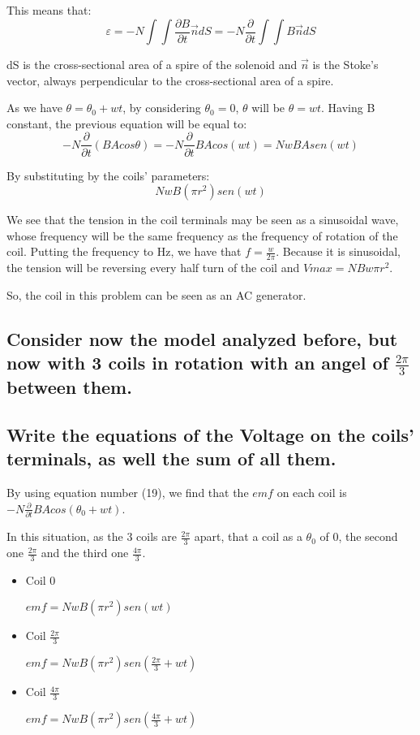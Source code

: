 \documentclass[a4paper,12pt]{article}
\begin{document}
This means that:
\begin{equation}
\varepsilon = -N\int \int \frac{\partial B}{\partial t}\vec{n}dS = -N\frac{\partial }{\partial t}\int \int B\vec{n}dS
\end{equation}


dS is the cross-sectional area of a spire of the solenoid and $\vec{n}$ is the Stoke's vector, always perpendicular to the cross-sectional area of a spire.


As we have $\theta = \theta_0 + wt$, by considering $\theta_0 = 0$, $\theta$ will be $\theta = wt$. Having B constant, the previous equation will be equal to:
\begin{equation}
-N\frac{\partial}{\partial t}(BAcos\theta ) = -N\frac{\partial }{\partial t}BAcos\left (wt  \right ) = NwBAsen\left (wt \right )
\end{equation}

By substituting by the coils' parameters:
\begin{equation}
NwB(\pi r^2)sen\left (wt \right )
\end{equation}
	
We see that the tension in the coil terminals may be seen as a sinusoidal wave, whose frequency will be the same frequency as the frequency of rotation of the coil. Putting the frequency to Hz, we have that $f = \frac{w}{2\pi}$. 
Because it is sinusoidal, the tension will be reversing every half turn of the coil and $Vmax = NBw\pi r^2$.

So, the coil in this problem can be seen as an AC generator.


\subsection{Consider now the model analyzed before, but now with 3 coils in rotation with an angel of $\frac{2 \pi}{3}$ between them.}
\subsection{Write the equations of the Voltage on the coils' terminals, as well the sum of all them.}

By using equation number (19), we find that the $emf$ on each coil is $-N\frac{\partial }{\partial t} BA cos(\theta _0 + wt)$. 

In this situation, as the 3 coils are $\frac{2 \pi}{3}$ apart, that a coil as a $\theta_0$ of $0$, the second one $\frac{2 \pi}{3}$ and the third one $\frac{4 \pi}{3}$.
\begin{itemize}
\item Coil $0$

$emf = NwB(\pi r^2)sen\left (wt \right )$
\item Coil $\frac{2 \pi}{3}$

$emf = NwB(\pi r^2)sen\left (\frac{2 \pi}{3}+ wt \right )$

\item  Coil $\frac{4 \pi}{3}$

$emf = NwB(\pi r^2)sen\left (\frac{4 \pi}{3}+ wt \right )$
\end{itemize}
\end{document}
